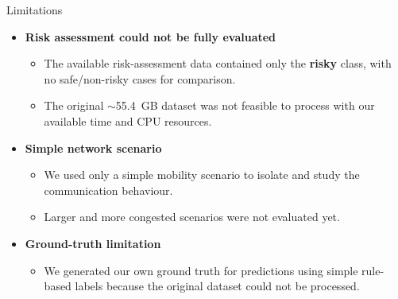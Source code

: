 \documentclass[aspectratio=169]{beamer}
\begin{document}
\begin{frame}{Limitations}

\small

\begin{itemize}

    \item \textbf{Risk assessment could not be fully evaluated}
    \begin{itemize}
        \item The available risk-assessment data contained only the
        \textbf{risky} class, with no safe/non-risky cases for comparison.
        \item The original $\sim$55.4~GB dataset was not feasible to
        process with our available time and CPU resources.
    \end{itemize}

    \vspace{0.12cm}

    \item \textbf{Simple network scenario}
    \begin{itemize}
        \item We used only a simple mobility scenario
        to isolate and study the communication behaviour.
        \item Larger and more congested scenarios were not evaluated yet.
    \end{itemize}

    \vspace{0.12cm}

    \item \textbf{Ground-truth limitation}
    \begin{itemize}
        \item We generated our own ground truth for predictions using simple rule-based labels because the original dataset could not
        be processed.
    \end{itemize}

\end{itemize}

\end{frame}
\end{document}
